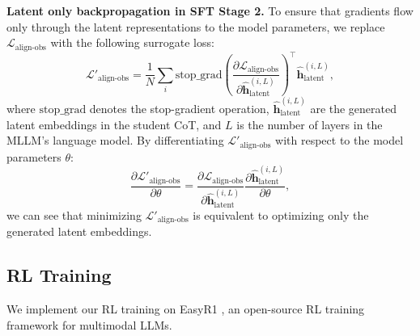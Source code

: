 \textbf{Latent only backpropagation in SFT Stage 2.}
To ensure that gradients flow only through the latent representations to the model parameters, we replace $\mathcal{L}_{\text{align-obs}}$ with the following surrogate loss:
\begin{equation}
   \mathcal{L'}_{\text{align-obs}} = \frac{1}{N}\sum_i \text{stop\_grad}(\frac{\partial \mathcal{L}_{\text{align-obs}}}{\partial {\hat{\mathbf{h}}^{(i, L)}_{\text{latent}}}})^\top {\hat{\mathbf{h}}^{(i, L)}_{\text{latent}}},
\end{equation}
where $\text{stop\_grad}$ denotes the stop-gradient operation, $\hat{\mathbf{h}}^{(i, L)}_{\text{latent}}$ are the generated latent embeddings in the student CoT, and $L$ is the number of layers in the MLLM’s language model. By differentiating $\mathcal{L'}_{\text{align-obs}}$ with respect to the model parameters $\theta$:
\begin{equation}
    \frac{\partial \mathcal{L'}_{\text{align-obs}}}{\partial \theta}= \frac{\partial \mathcal{L}_{\text{align-obs}}}{\partial {\hat{\mathbf{h}}^{(i, L)}_{\text{latent}}}} \frac{\partial {\hat{\mathbf{h}}^{(i, L)}_{\text{latent}}} }{\partial \theta},
\end{equation}
we can see that minimizing $\mathcal{L'}_{\text{align-obs}}$ is equivalent to optimizing only the generated latent embeddings.

\subsection{RL Training}
We implement our RL training on EasyR1 \citep{zheng2025easyr1}, an open-source RL training framework for multimodal LLMs.


